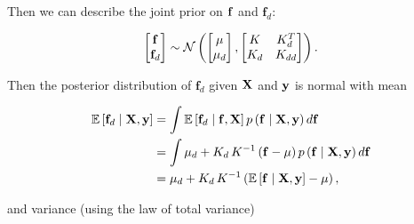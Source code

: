 \documentclass{draft}
\newcommand{\pd}{\ensuremath{\partial \,}}     %
\newcommand{\gradient}{\ensuremath{\mathbf{f}_d}} %
\begin{document}
Then we can describe the joint prior on \( \mathbf{f} \) and \( \gradient \):

\begin{align}
    \begin{bmatrix}
        \mbf{f} \\
        \gradient
    \end{bmatrix}
    \sim
    \N
    \left(
        \begin{bmatrix}
            \mu \\
            \mu_d
        \end{bmatrix},
        \begin{bmatrix}
            K   & K_d^T \\
            K_d & K_{dd}
        \end{bmatrix}
    \right).
\end{align}

Then the posterior distribution of \( \gradient \) given \( \mathbf{X} \) and \( \mathbf{y} \) is normal with mean

\begin{align}
    \E \left[ \gradient \mid \mbf{X}, \mbf{y} \right]
    & =
    \int \E \left[ \gradient \mid \mbf{f}, \mbf{X} \right] p \left( \mbf{f} \mid \mbf{X}, \mbf{y} \right) d\mbf{f} \\
    & = 
    \int \mu_d + K_d \, K^{-1} \left( \mbf{f} - \mu \right) p \left( \mbf{f}  \mid \mbf{X}, \mbf{y} \right) d\mbf{f} \\
    & =  \mu_d + K_d \, K^{-1} \left( \E \left[ \mbf{f} \mid \mbf{X}, \mbf{y} \right] - \mu \right),
\end{align}

and variance (using the law of total variance)
\end{document}
